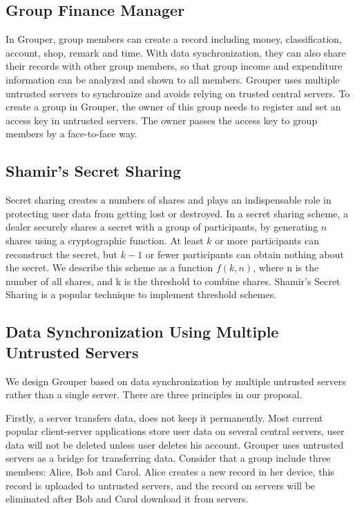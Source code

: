 \documentclass[twocolumn,10pt]{article}
\begin{document}
\subsection{Group Finance Manager}
 In Grouper, group members can create a record including money, classification, account, shop, remark and time. With data synchronization, they can also share their records with other group members, so that group income and expenditure information can be analyzed and shown to all members. Grouper uses multiple untrusted servers to synchronize and avoids relying on trusted central servers. To create a group in Grouper, the owner of this group needs to register and set an access key in untrusted servers. The owner passes the access key to group members by a face-to-face way.

\subsection{Shamir's Secret Sharing}
Secret sharing creates a numbers of shares and plays an indispensable role in protecting user data from getting lost or destroyed. In a secret sharing scheme, a dealer securely shares a secret with a group of participants, by generating $n$ shares using a cryptographic function\cite{smith2013layered}. At least $k$ or more participants can reconstruct the secret, but $k-1$ or fewer participants can obtain nothing about the secret\cite{pang2005new}. We describe this scheme as a function $f(k, n)$, where n is the number of all shares, and k is the threshold to combine shares.  Shamir's Secret Sharing is a popular technique to implement threshold schemes.

\subsection{Data Synchronization Using Multiple Untrusted Servers}

We design Grouper based on data synchronization by multiple untrusted servers rather than a single server. There are three principles in our proposal. 

Firstly, a server transfers data, does not keep it permanently. Most current popular client-server applications store user data on several central servers, user data will not be deleted unless user deletes his account. Grouper uses untrusted servers as a bridge for transferring data. Consider that a group include three members: Alice, Bob and Carol. Alice creates a new record in her device, this record is uploaded to untrusted servers, and the record on servers will be eliminated after Bob and Carol download it from servers.
\end{document}
